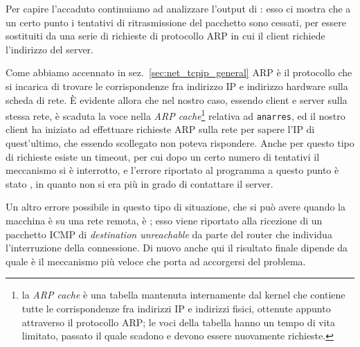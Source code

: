 Per capire l'accaduto continuiamo ad analizzare l'output di :
esso ci mostra che a un certo punto i tentativi di ritrasmissione del
pacchetto sono cessati, per essere sostituiti da una serie di richieste di
protocollo ARP in cui il client richiede l'indirizzo del server.

Come abbiamo accennato in sez.~\ref{sec:net_tcpip_general} ARP è il protocollo
che si incarica di trovare le corrispondenze fra indirizzo IP e indirizzo
hardware sulla scheda di rete. È evidente allora che nel nostro caso, essendo
client e server sulla stessa rete, è scaduta la voce nella \textit{ARP
  cache}\footnote{la \textit{ARP cache} è una tabella mantenuta internamente
  dal kernel che contiene tutte le corrispondenze fra indirizzi IP e indirizzi
  fisici, ottenute appunto attraverso il protocollo ARP; le voci della tabella
  hanno un tempo di vita limitato, passato il quale scadono e devono essere
  nuovamente richieste.} relativa ad \texttt{anarres}, ed il nostro client ha
iniziato ad effettuare richieste ARP sulla rete per sapere l'IP di
quest'ultimo, che essendo scollegato non poteva rispondere. Anche per questo
tipo di richieste esiste un timeout, per cui dopo un certo numero di tentativi
il meccanismo si è interrotto, e l'errore riportato al programma a questo
punto è stato , in quanto non si era più in grado di
contattare il server.

Un altro errore possibile in questo tipo di situazione, che si può avere
quando la macchina è su una rete remota, è ; esso viene
riportato alla ricezione di un pacchetto ICMP di \textit{destination
  unreachable} da parte del router che individua l'interruzione della
connessione. Di nuovo anche qui il risultato finale dipende da quale è il
meccanismo più veloce che porta ad accorgersi del problema.

